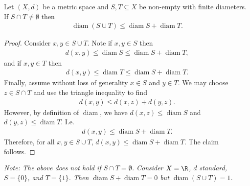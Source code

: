 \documentclass{article}
\DeclareMathOperator{\diam}{diam}
\begin{document}
\begin{claim*}[4]
	Let $(X,d)$ be a metric space and $S,T\subseteq X$ be non-empty with finite diameters.
	If $S\cap T\not=\emptyset$ then
	\begin{align}
		\diam(S\cup T) \leq \diam S + \diam T.
	\end{align}
	\begin{proof}
		Consider $x,y\in S\cup T$. Note if $x,y\in S$ then
		\begin{align*}
			d(x,y) \leq \diam S \leq \diam S + \diam T,
		\end{align*}
		and if $x,y\in T$ then
		\begin{align*}
			d(x,y) \leq \diam T \leq \diam S + \diam T.
		\end{align*}
		Finally, assume without loss of generality $x\in S$ and $y\in T$. We may choose
		$z\in S\cap T$ and use the triangle inequality to find
		\begin{align*}
			d(x,y) \leq d(x,z) + d(y,z).
		\end{align*}
		However, by definition of $\diam$, we have $d(x,z) \leq \diam S$ and $d(y,z) \leq \diam T$.
		I.e.
		\begin{align*}
			d(x,y) \leq \diam S + \diam T.
		\end{align*}
		Therefore, for all $x,y\in S\cup T$, $d(x,y) \leq \diam S + \diam T$. The claim follows.
	\end{proof}
\end{claim*}

\emph{Note: The above does not hold if $S\cap T=\emptyset$. Consider $X=\R$, $d$ standard,
	$S=\{0\}$, and $T=\{1\}$. Then $\diam S + \diam T = 0$ but $\diam (S\cup T) = 1$.}
\end{document}
